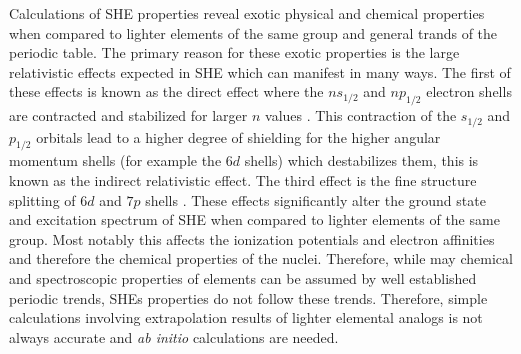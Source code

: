 \documentclass[10pt,a4paper, twoside, openright]{report}
\begin{document}
\linebreak
Calculations of SHE properties reveal exotic physical and chemical properties when compared to lighter elements of the same group and general trands of the periodic table.  The primary reason for these exotic properties is the large relativistic effects expected in SHE which can manifest in many ways. The first of these effects is known as the direct effect where the $ns_{1/2}$ and $np_{1/2}$ electron shells are contracted and stabilized for larger $n$ values \cite{Desclaux1976, Pitzer1979, Pyykko1979}. This contraction of the $s_{1/2}$ and $p_{1/2}$ orbitals lead to a higher degree of shielding for the higher angular momentum shells (for example the $6d$ shells) which destabilizes them, this is known as the indirect relativistic effect. The third effect is the fine structure splitting of $6d$ and $7p$ shells \cite{Pyykko1988, DF2016, LDFSg2019}. These effects significantly alter the ground state and excitation spectrum of SHE when compared to lighter elements of the same group. Most notably this affects the ionization potentials and electron affinities and therefore the chemical properties of the nuclei. Therefore, while may chemical and spectroscopic properties of elements can be assumed by well established periodic trends, SHEs properties do not follow these trends. Therefore, simple calculations involving extrapolation results of lighter elemental analogs is not always accurate and \textit{ab initio} calculations are needed.\\
\linebreak
\end{document}
